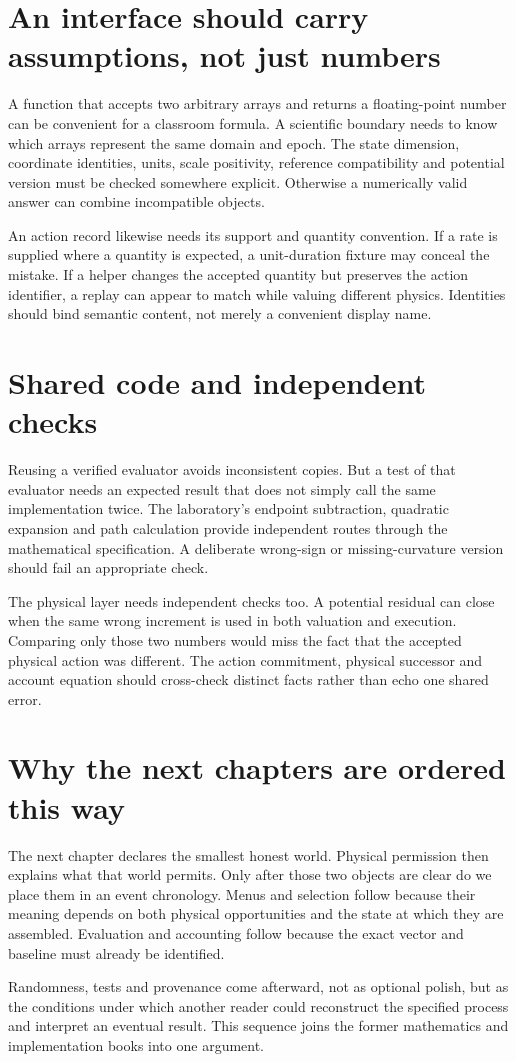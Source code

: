 \section{An interface should carry assumptions, not just numbers}
A function that accepts two arbitrary arrays and returns a floating-point
number can be convenient for a classroom formula. A scientific boundary
needs to know which arrays represent the same domain and epoch. The
state dimension, coordinate identities, units, scale positivity, reference
compatibility and potential version must be checked somewhere explicit.
Otherwise a numerically valid answer can combine incompatible objects.

An action record likewise needs its support and quantity convention.
If a rate is supplied where a quantity is expected, a unit-duration
fixture may conceal the mistake. If a helper changes the accepted
quantity but preserves the action identifier, a replay can appear to
match while valuing different physics. Identities should bind semantic
content, not merely a convenient display name.

\section{Shared code and independent checks}
Reusing a verified evaluator avoids inconsistent copies. But a test of
that evaluator needs an expected result that does not simply call the
same implementation twice. The laboratory's endpoint subtraction,
quadratic expansion and path calculation provide independent routes
through the mathematical specification. A deliberate wrong-sign or
missing-curvature version should fail an appropriate check.

The physical layer needs independent checks too. A potential residual
can close when the same wrong increment is used in both valuation and
execution. Comparing only those two numbers would miss the fact that
the accepted physical action was different. The action commitment,
physical successor and account equation should cross-check distinct
facts rather than echo one shared error.

\section{Why the next chapters are ordered this way}
The next chapter declares the smallest honest world. Physical permission
then explains what that world permits. Only after those two objects are
clear do we place them in an event chronology. Menus and selection follow
because their meaning depends on both physical opportunities and the
state at which they are assembled. Evaluation and accounting follow
because the exact vector and baseline must already be identified.

Randomness, tests and provenance come afterward, not as optional polish,
but as the conditions under which another reader could reconstruct the
specified process and interpret an eventual result. This sequence joins
the former mathematics and implementation books into one argument.
